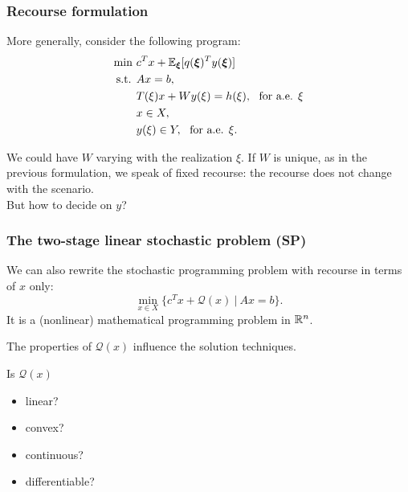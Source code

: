 \documentclass[aspectratio=169]{beamer}
\begin{document}
\begin{frame}
	\frametitle{Recourse formulation}
	
	More generally, consider the following program:
	\begin{align*}
	\min\ & c^Tx+{\mathbb{E}}_{{\boldsymbol{\xi}}}[q({\boldsymbol{\xi}})^Ty({\boldsymbol{\xi}})] \\
	\mbox{s.t. } & Ax = b, \\
	& T(\xi)x + Wy(\xi) = h(\xi),\ \text{ for a.e. } \xi \\
	& x \in X, \\
	& y(\xi) \in Y,\ \text{ for a.e. } \xi.
	\end{align*}
	
	We could have $W$ varying with the realization $\xi$.
	If $W$ is unique, as in the previous formulation, we speak of {\red fixed recourse}: the recourse does not change with the scenario.\\
	But how to decide on $y$?
	
\end{frame}

\begin{frame}
	\frametitle{The two-stage linear stochastic problem (SP)}
	
	We can also rewrite the stochastic programming problem with recourse in terms of $x$ only:
	\[
	\min_{x \in X} \lbrace c^T x + \mathcal{Q}(x) \ |\  Ax = b \rbrace.
	\]
	It is a (nonlinear) mathematical programming problem in ${\mathbb{R}}^n$.
	
	The properties of $\mathcal{Q}(x)$ influence the solution techniques.
	
	\mbox{}
	
	Is $\mathcal{Q}(x)$
	\begin{itemize}
		\item
		linear?
		\item
		convex?
		\item
		continuous?
		\item
		differentiable?
	\end{itemize}
	
\end{frame}
\end{document}
